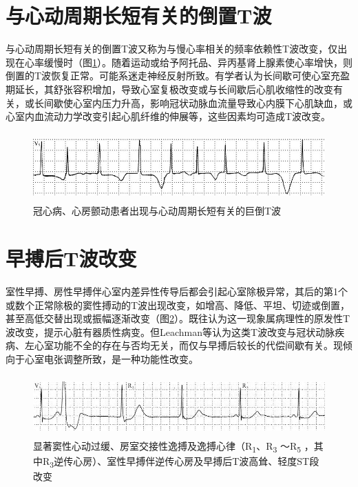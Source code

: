 \protect\hypertarget{text00012.htmlux5cux23subid97}{}{}

\section{与心动周期长短有关的倒置T波}

与心动周期长短有关的倒置T波又称为与慢心率相关的频率依赖性T波改变，仅出现在心率缓慢时（图\ref{fig6-16}）。随着运动或给予阿托品、异丙基肾上腺素使心率增快，则倒置的T波恢复正常。可能系迷走神经反射所致。有学者认为长间歇可使心室充盈期延长，其舒张容积增加，导致心室复极改变或与长间歇后心肌收缩性的改变有关，或长间歇使心室内压力升高，影响冠状动脉血流量导致心内膜下心肌缺血，或心室内血流动力学改变引起心肌纤维的伸展等，这些因素均可造成T波改变。

\begin{figure}[!htbp]
 \centering
 \includegraphics[width=5.39583in,height=1.03125in]{./images/Image00108.jpg}
 \captionsetup{justification=centering}
 \caption{冠心病、心房颤动患者出现与心动周期长短有关的巨倒T波}
 \label{fig6-16}
  \end{figure} 

\protect\hypertarget{text00012.htmlux5cux23subid98}{}{}

\section{早搏后T波改变}

室性早搏、房性早搏伴心室内差异性传导后都会引起心室除极异常，其后的第1个或数个正常除极的窦性搏动的T波出现改变，如增高、降低、平坦、切迹或倒置，甚至高低交替出现或振幅逐渐改变（图\ref{fig6-17}）。既往认为这一现象属病理性的原发性T波改变，提示心脏有器质性病变。但Leachman等认为这类T波改变与冠状动脉疾病、左心室功能不全的存在与否均无关，而仅与早搏后较长的代偿间歇有关。现倾向于心室电张调整所致，是一种功能性改变。

\begin{figure}[!htbp]
 \centering
 \includegraphics[width=5.59375in,height=0.91667in]{./images/Image00109.jpg}
 \captionsetup{justification=centering}
 \caption{显著窦性心动过缓、房室交接性逸搏及逸搏心律（R\textsubscript{1}、R\textsubscript{3} ～R\textsubscript{5} ，其中R\textsubscript{3}逆传心房）、室性早搏伴逆传心房及早搏后T波高耸、轻度ST段改变}
 \label{fig6-17}
  \end{figure} 


